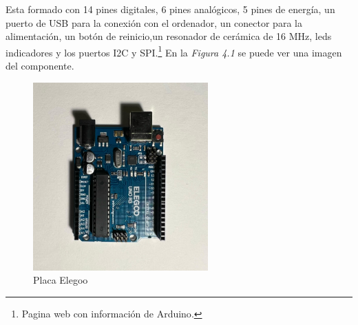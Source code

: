 Esta formado con 14 pines digitales, 6 pines analógicos, 5 pines de energía, un puerto de USB para la conexión con el ordenador, un conector para la alimentación, un botón de reinicio,un resonador de cerámica de 16 MHz, leds indicadores y los puertos I2C y SPI.\cite{Arduino}\footnote{Pagina web con información de Arduino\cite{Arduino}.}
En la \textit{Figura 4.1} se puede ver una imagen del componente.
\begin{figure}[h]
        \centering
        \includegraphics[angle=90,width=0.6\textwidth]{img/placa elegoo.png}
        \caption{Placa Elegoo}
        \label{fig:activforce}
    \end{figure}

